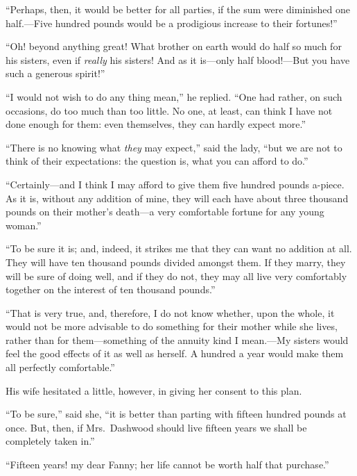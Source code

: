 \documentclass{article}
\begin{document}
``Perhaps, then, it would be better for all parties,
if the sum were diminished one half.---Five hundred pounds
would be a prodigious increase to their fortunes!''

``Oh! beyond anything great!  What brother on earth
would do half so much for his sisters, even if \emph{really}
his sisters!  And as it is---only half blood!---But you
have such a generous spirit!''

``I would not wish to do any thing mean,'' he replied.
``One had rather, on such occasions, do too much than
too little.  No one, at least, can think I have not
done enough for them: even themselves, they can hardly
expect more.''

``There is no knowing what \emph{they} may expect,''
said the lady, ``but we are not to think of their
expectations: the question is, what you can afford to do.''

``Certainly---and I think I may afford to give them five
hundred pounds a-piece.  As it is, without any addition
of mine, they will each have about three thousand pounds
on their mother's death---a very comfortable fortune
for any young woman.''

``To be sure it is; and, indeed, it strikes me that
they can want no addition at all.  They will have ten
thousand pounds divided amongst them.  If they marry,
they will be sure of doing well, and if they do not,
they may all live very comfortably together on the interest
of ten thousand pounds.''

``That is very true, and, therefore, I do not know whether,
upon the whole, it would not be more advisable to do
something for their mother while she lives, rather than
for them---something of the annuity kind I mean.---My sisters
would feel the good effects of it as well as herself.
A hundred a year would make them all perfectly comfortable.''

His wife hesitated a little, however, in giving
her consent to this plan.

``To be sure,'' said she, ``it is better than parting with
fifteen hundred pounds at once.  But, then, if Mrs.\ Dashwood
should live fifteen years we shall be completely taken in.''

``Fifteen years! my dear Fanny; her life cannot
be worth half that purchase.''
\end{document}
